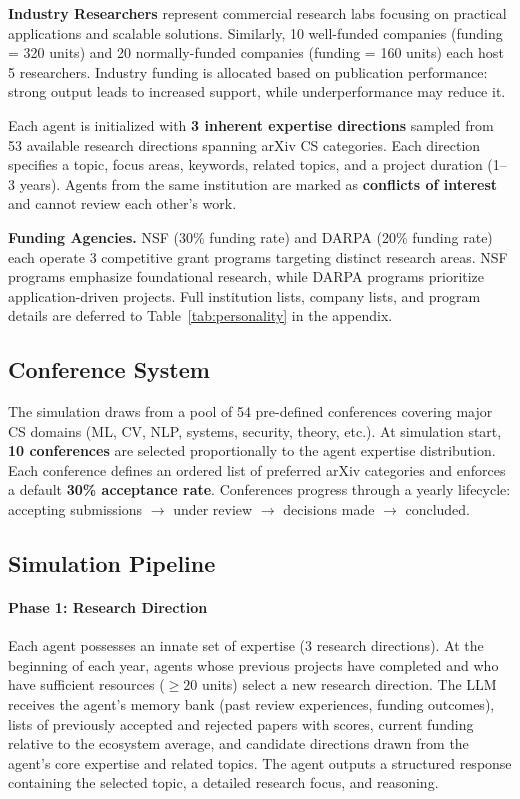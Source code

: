 \documentclass{article}
\begin{document}
\noindent \textbf{Industry Researchers} represent commercial research labs focusing on practical applications and scalable solutions. Similarly, 10 well-funded companies (funding = 320 units) and 20 normally-funded companies (funding = 160 units) each host 5 researchers. Industry funding is allocated based on publication performance: strong output leads to increased support, while underperformance may reduce it.

\noindent Each agent is initialized with \textbf{3 inherent expertise directions} sampled from 53 available research directions spanning arXiv CS categories. Each direction specifies a topic, focus areas, keywords, related topics, and a project duration (1--3 years). Agents from the same institution are marked as \textbf{conflicts of interest} and cannot review each other's work.

\noindent \textbf{Funding Agencies.} NSF (30\% funding rate) and DARPA (20\% funding rate) each operate 3 competitive grant programs targeting distinct research areas. NSF programs emphasize foundational research, while DARPA programs prioritize application-driven projects. Full institution lists, company lists, and program details are deferred to Table~\ref{tab:personality} in the appendix.


\subsection{Conference System}

The simulation draws from a pool of 54 pre-defined conferences covering major CS domains (ML, CV, NLP, systems, security, theory, etc.). At simulation start, \textbf{10 conferences} are selected proportionally to the agent expertise distribution. Each conference defines an ordered list of preferred arXiv categories and enforces a default \textbf{30\% acceptance rate}. Conferences progress through a yearly lifecycle: accepting submissions $\rightarrow$ under review $\rightarrow$ decisions made $\rightarrow$ concluded.


\subsection{Simulation Pipeline}

\paragraph{Phase 1: Research Direction}
Each agent possesses an innate set of expertise (3 research directions). At the beginning of each year, agents whose previous projects have completed and who have sufficient resources ($\geq 20$ units) select a new research direction. The LLM receives the agent's memory bank (past review experiences, funding outcomes), lists of previously accepted and rejected papers with scores, current funding relative to the ecosystem average, and candidate directions drawn from the agent's core expertise and related topics. The agent outputs a structured response containing the selected topic, a detailed research focus, and reasoning.
\end{document}

